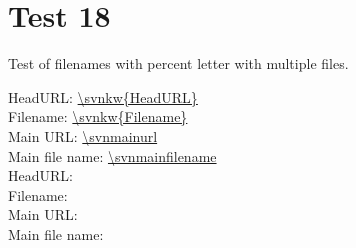 \documentclass[12pt]{report}
\begin{document}
\chapter{Test 18}
Test of filenames with percent letter with multiple files.

\noindent
HeadURL: \url{\svnkw{HeadURL}} \\
Filename: \url{\svnkw{Filename}} \\
Main URL: \url{\svnmainurl} \\
Main file name: \url{\svnmainfilename} \\

\noindent
HeadURL:  \\
Filename:  \\
Main URL: \svnnolinkurl{\svnmainurl} \\
Main file name: \svnnolinkurl{\svnmainfilename} \\


\end{document}
